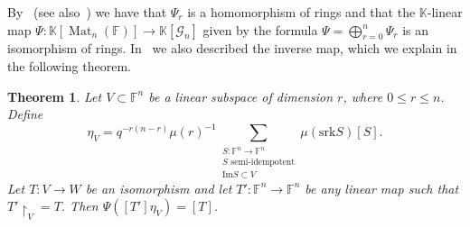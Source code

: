\documentclass[12pt, reqno]{amsart}
\newtheorem{theorem}{Theorem}[section]
\theoremstyle{definition}
\newcommand{\coefficientsField}{\mathbb{K}}
\newcommand{\ImageOf}{\mathrm{Im}}
\newcommand{\finiteField}{\mathbb{F}}
\newcommand{\squareMatrix}{\operatorname{Mat}}
\newcommand{\srank}{\mathrm{srk}}
\begin{document}
	By~\cite[Proposition 2.2]{HarmanSnowdenZelingher2025} (see also~\cite{Kovacs1992}) we have that $\Psi_r$ is a homomorphism of rings and that the $\coefficientsField$-linear map $\Psi \colon \coefficientsField\left[\squareMatrix_n\left(\finiteField\right)\right] \to \coefficientsField\left[\mathcal{G}_{n}\right]$ given by the formula $\Psi = \bigoplus_{r=0}^n \Psi_r$ is an isomorphism of rings. In~\cite[Section 4]{HarmanSnowdenZelingher2025} we also described the inverse map, which we explain in the following theorem.
	
	\begin{theorem}\label{thm:inverse-image-of-Psi}
		Let $V \subset \finiteField^n$ be a linear subspace of dimension $r$, where $0 \le r \le n$. Define
		\begin{displaymath}
		\eta_V = q^{-r \left(n - r\right)} \mu\left(r\right)^{-1} \sum_{\substack{S \colon \finiteField^n \to \finiteField^n\\
				S \text{ semi-idempotent}\\
				\ImageOf S \subset V}} \mu\left(\srank S\right) \left[S\right].
				\end{displaymath}
		Let $T \colon V \to W$ be an isomorphism and let $T' \colon \finiteField^n \to \finiteField^n$ be any linear map such that $T' \restriction_{V} = T$. Then $\Psi\left(\left[T'\right] \eta_V\right) = \left[T\right]$.
	\end{theorem}
\end{document}
